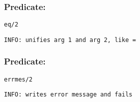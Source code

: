 \subsubsection{Predicate:} \label{eqV95W2}

\begin{verbatim}
eq/2
\end{verbatim}

{\small \begin{verbatim}
INFO: unifies arg 1 and arg 2, like =

\end{verbatim}}

\subsubsection{Predicate:} \label{errmesV95W2}

\begin{verbatim}
errmes/2
\end{verbatim}

{\small \begin{verbatim}
INFO: writes error message and fails

\end{verbatim}}
